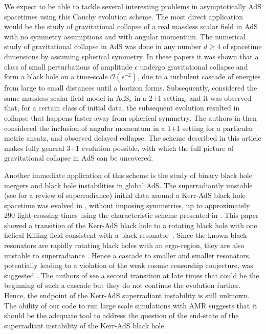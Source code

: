 \documentclass[a4paper,11pt]{article}
\numberwithin{equation}{section}
\begin{document}
We expect to be able to tackle several interesting problems in asymptotically AdS spacetimes using this Cauchy evolution scheme. The most direct application would be the study of gravitational collapse of a real massless scalar field in AdS with no symmetry assumptions and with angular momentum.
The numerical study of gravitational collapse in AdS was done in any number $d\geq 4$ of spacetime dimensions by \cite{Bizon:2011gg,Jalmuzna:2011qw} assuming spherical symmetry. 
In these papers it was shown that a class of small perturbations of amplitude $\epsilon$ undergo gravitational collapse and form a black hole on a time-scale $\mathcal{O}(\epsilon^{-2})$, due to a turbulent cascade of energies from large to small distances until a horizon forms.
Subsequently, \cite{Bantilan:2017kok} considered the same massless scalar field model in AdS$_5$ in a 2+1 setting, and it was observed that, for a certain class of initial data, the subsequent evolution resulted in collapse that happens faster away from spherical symmetry.
The authors in \cite{Choptuik:2017cyd} then considered the inclusion of angular momentum in a 1+1 setting for a particular metric ansatz, and observed delayed collapse.
The scheme described in this article makes fully general 3+1 evolution possible, with which the full picture of gravitational collapse in AdS can be uncovered.

Another immediate application of this scheme is the study of binary black hole mergers and black hole instabilities in global AdS.
The superradiantly unstable (see \cite{Brito:2015oca} for a review of superradiance) initial data around a Kerr-AdS black hole spacetime was evolved in \cite{Chesler:2018txn}, without imposing symmetries, up to approximately 290 light-crossing times using the characteristic scheme presented in \cite{Chesler:2013lia}. This paper showed a transition of the Kerr-AdS black hole to a rotating black hole with one helical Killing field consistent with a black resonator~\cite{Dias:2015rxy}. Since the known black resonators are rapidly rotating black holes with an ergo-region, they are also unstable to superradiance \cite{Hawking:1999dp,Green:2015kur}. Hence a cascade to smaller and smaller resonators, potentially leading to a violation of the weak cosmic censorship conjecture, was suggested \cite{Niehoff:2015oga}. The authors of \cite{Chesler:2018txn} see a second transition at late times that could be the beginning of such a cascade but they do not continue the evolution further. Hence, the endpoint of the Kerr-AdS superradiant instability is still unknown. The ability of our code to run large scale simulations with AMR suggests that it should be the adequate tool to address the question of the end-state of the superradiant instability of the Kerr-AdS black hole. 
\end{document}
